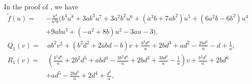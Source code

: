 \documentclass[microtype]{gtpart}     %
\theoremstyle{remark}
\theoremstyle{definition}
\newcommand{\Tf}{\widetilde{f}}
\begin{document}
In the proof of , we have 
\begin{equation*}
\begin{split}
 \Tf(u) = & -\frac{u^4}{a^2 b} \big( b^4 u^8 + 3 a b^3 u^7 + 3 a^2 b^2 u^6 + (a^3 b + 7 a b^2) u^5 + (6 a^2 b - 6 b^2) u^4 \\
          & + 9 a b u^3 + (-a^2 + 8 b) u^2 - 3 a u - 3 \big), \\
 Q_1(v) = & ~ a b^2 v^2 + (b^2 d^2 + 2 a b d - b) v + \frac{b^2 d^4}{a} + 2 b d^3 + a d^2 - \frac{2 b d^2}{a} - d + \frac{1}{a}, \\
 R_1(v) = & ~ (\frac{b^3 d^6}{a} + 2 b^2 d^5 + a b d^4 - \frac{3 b^2 d^4}{a} + 2 b d^3 + \frac{3 b d^2}{a} - \frac{1}{a}) v + \frac{b^2 d^7}{a} + 2 b d^6 \qquad \\
          & + a d^5 - \frac{2 b d^5}{a} + 2 d^4 + \frac{d^3}{a}, 
\end{split}
\end{equation*}
\end{document}
